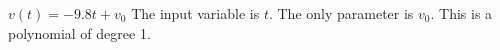 {$v(t) = -9.8t + v_0$}
{The input variable is $t$. The only parameter is $v_0$. This is a polynomial of degree 1.}
